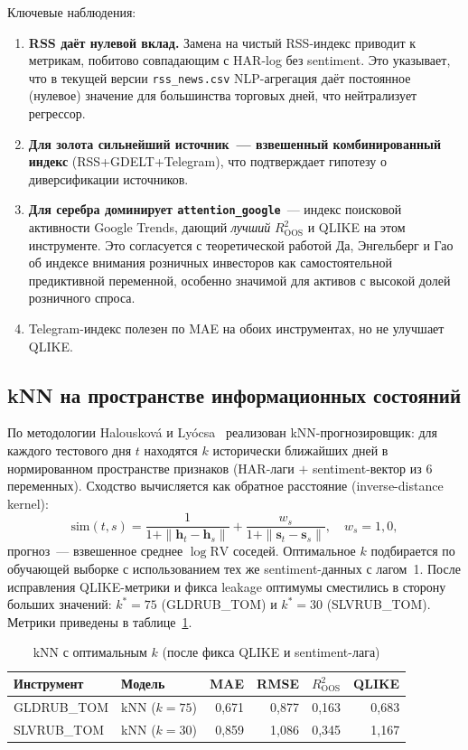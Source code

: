 Ключевые наблюдения:
\begin{enumerate}
    \item \textbf{RSS даёт нулевой вклад.} Замена на чистый RSS-индекс
          приводит к метрикам, побитово совпадающим с HAR-log без sentiment.
          Это указывает, что в текущей версии \texttt{rss\_news.csv}
          NLP-агрегация даёт постоянное (нулевое) значение для большинства
          торговых дней, что нейтрализует регрессор.
    \item \textbf{Для золота сильнейший источник~--- взвешенный комбинированный
          индекс} (RSS+GDELT+Telegram), что подтверждает гипотезу о
          диверсификации источников.
    \item \textbf{Для серебра доминирует \texttt{attention\_google}}~---
          индекс поисковой активности Google Trends, дающий
          \textit{лучший} $R^2_{\mathrm{OOS}}$ и QLIKE на этом инструменте.
          Это согласуется с теоретической работой
          Да, Энгельберг и Гао~\cite{Da2011} об индексе внимания розничных
          инвесторов как самостоятельной предиктивной переменной,
          особенно значимой для активов с высокой долей розничного спроса.
    \item Telegram-индекс полезен по MAE на обоих инструментах,
          но не улучшает QLIKE.
\end{enumerate}

\subsection{kNN на пространстве информационных состояний}

По методологии Halousková и Lyócsa~\cite{Halouskova2025}
реализован kNN-прогнозировщик: для каждого тестового дня $t$
находятся $k$ исторически ближайших дней в нормированном пространстве
признаков (HAR-лаги $+$ sentiment-вектор из 6 переменных).
Сходство вычисляется как обратное расстояние (inverse-distance kernel):
\[
  \mathrm{sim}(t, s) = \frac{1}{1+\|\mathbf{h}_t - \mathbf{h}_s\|} +
                       \frac{w_s}{1+\|\mathbf{s}_t - \mathbf{s}_s\|},
  \quad w_s = 1{,}0,
\]
прогноз~--- взвешенное среднее $\log\mathrm{RV}$ соседей.
Оптимальное $k$ подбирается по обучающей выборке с использованием
тех же sentiment-данных с лагом~1.
После исправления QLIKE-метрики и фикса leakage оптимумы
сместились в сторону больших значений: $k^* = 75$ (GLDRUB\_TOM)
и $k^* = 30$ (SLVRUB\_TOM).
Метрики приведены в таблице~\ref{tab:knn_results}.

\begin{table}[h!]
\centering
\caption{kNN с оптимальным $k$ (после фикса QLIKE и sentiment-лага)}
\label{tab:knn_results}
\begin{tabular}{llrrrr}
\hline
Инструмент & Модель & MAE & RMSE & $R^2_{\mathrm{OOS}}$ & QLIKE \\
\hline
GLDRUB\_TOM & kNN ($k=75$) & 0{,}671 & 0{,}877 & 0{,}163 & 0{,}683 \\
SLVRUB\_TOM & kNN ($k=30$) & 0{,}859 & 1{,}086 & 0{,}345 & 1{,}167 \\
\hline
\end{tabular}
\end{table}

